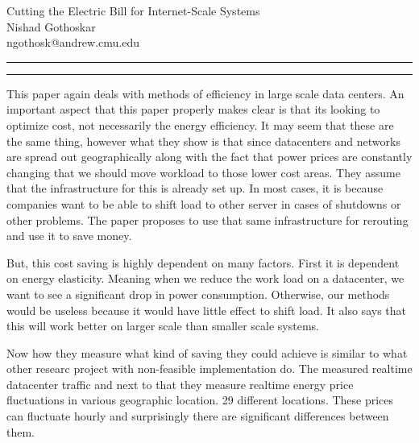 \documentclass[11pt]{article}
\newcommand{\question}[2] {\vspace{.25in} \hrule\vspace{0.5em}
	\noindent{\bf #1: #2} \vspace{0.5em}
	\hrule \vspace{.10in}}
\newcommand{\myname}{Nishad Gothoskar}
\newcommand{\myandrew}{ngothosk}
\begin{document}
	
	\medskip                        %
	
	\thispagestyle{plain}
	\begin{center}                  %
		{\Large Cutting the Electric Bill for Internet-Scale Systems} \\
		\myname \\
		\myandrew @andrew.cmu.edu\\
	\end{center}
	
	\question{1}{Summary}
	\quad This paper again deals with methods of efficiency in large scale data centers. An important aspect that this paper properly makes clear is that its looking to optimize cost, not necessarily the energy efficiency. It may seem that these are the same thing, however what they show is that since datacenters and networks are spread out geographically along with the fact that power prices are constantly changing that we should move workload to those lower cost areas. They assume that the infrastructure for this is already set up. In most cases, it is because companies want to be able to shift load to other server in cases of shutdowns or other problems. The paper proposes to use that same infrastructure for rerouting and use it to save money.
	
	\quad But, this cost saving is highly dependent on many factors. First it is dependent on energy elasticity. Meaning when we reduce the work load on a datacenter, we want to see a significant drop in power consumption. Otherwise, our methods would be useless because it would have little effect to shift load. It also says that this will work better on larger scale than smaller scale systems.
	
	\quad Now how they measure what kind of saving they could achieve is similar to what other researc project with non-feasible implementation do. The measured realtime datacenter traffic and next to that they measure realtime energy price fluctuations in various geographic location. 29 different locations. These prices can fluctuate hourly and surprisingly there are significant differences between them.
	
	\quad 
	
\end{document}
